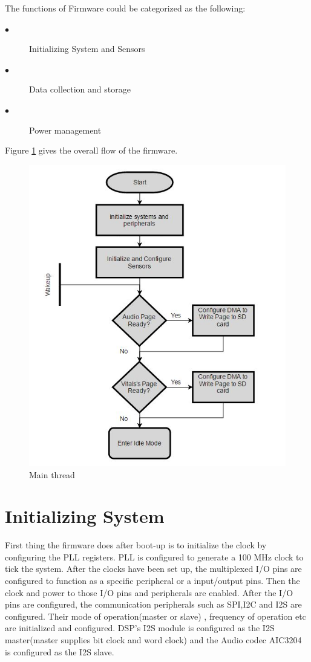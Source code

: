The functions of Firmware could be categorized as the following:
 \begin{description}
 	\item[$\bullet$]
Initializing System and Sensors 
 	\item[$\bullet$]
Data collection and storage
 	\item[$\bullet$]  
Power management 
 \end{description}
Figure \ref{main} gives the overall flow of the firmware.
 \begin{figure}[h]
	\centering
	\includegraphics[scale = 1 ]{main.JPG}
	\caption{Main thread\label{main}}
\end{figure}

\section{Initializing System}
First thing the firmware does after boot-up is to initialize the clock by configuring the PLL registers. PLL is configured to generate a 100 MHz clock to tick the system. After the clocks have been set up, the multiplexed I/O pins are configured to function as a specific peripheral or a input/output pins. Then the clock and power to those I/O pins and peripherals are enabled. After the I/O pins are configured, the communication peripherals such as SPI,I2C and I2S are configured. Their mode of operation(master or slave) , frequency of operation etc are initialized and configured. DSP's I2S module is configured as the I2S master(master supplies bit clock and word clock) and the Audio codec AIC3204 is configured as the I2S slave. 

